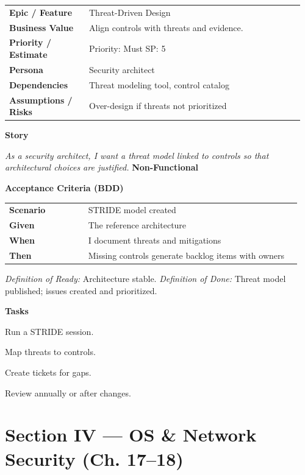 \documentclass[11pt,letterpaper]{article}
\makeatletter
\newenvironment{kvtable}{%
  \begin{tabular}{@{}>{\bfseries\arraybackslash}p{0.26\linewidth} p{0.70\linewidth}@{}}
}{\end{tabular}}
\newenvironment{bdd}{%
  \begin{tabular}{@{}>{\bfseries\arraybackslash}p{0.26\linewidth} p{0.70\linewidth}@{}}
}{\end{tabular}}
\newcommand{\DoRDoD}[2]{%
  \vspace{0.35em}
  {\footnotesize\color{Muted}%
    \textit{Definition of Ready:} #1 \; \textbullet\;
    \textit{Definition of Done:} #2%
  }%
}
\newenvironment{storycard}[2]{%
  \begin{tcolorbox}[cloudcard, title={#1 --- #2}]%
}{\end{tcolorbox}}
\newcommand{\sectionlabel}[1]{\vspace{0.35em}\textbf{#1}\par}
\makeatother
\begin{document}
\begin{storycard}{CCS-16}{Ch. 16 — Secure Cloud Architecture}
\begin{kvtable}
Epic / Feature & Threat-Driven Design\\
Business Value & Align controls with threats and evidence.\\
Priority / Estimate & Priority: Must \quad SP: 5\\
Persona & Security architect\\
Dependencies & Threat modeling tool, control catalog\\
Assumptions / Risks & Over-design if threats not prioritized\\
\end{kvtable}
\sectionlabel{Story}
\textit{As a security architect, I want a threat model linked to controls so that architectural choices are justified.}
\sectionlabel{Non-Functional}\;
\sectionlabel{Acceptance Criteria (BDD)}
\begin{bdd}
Scenario & STRIDE model created\\
Given & The reference architecture\\
When & I document threats and mitigations\\
Then & Missing controls generate backlog items with owners\\
\end{bdd}
\DoRDoD{Architecture stable.}{Threat model published; issues created and prioritized.}
\sectionlabel{Tasks}
\begin{checklist}
\item Run a STRIDE session.
\item Map threats to controls.
\item Create tickets for gaps.
\item Review annually or after changes.
\end{checklist}
\end{storycard}

\section{Section IV — OS \& Network Security (Ch. 17--18)}
\end{document}
